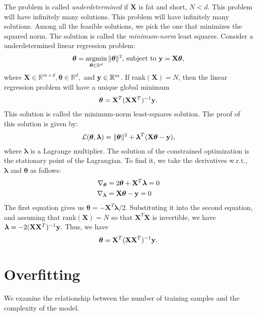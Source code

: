 The problem is called \textit{underdetermined} if $\mathbf{X}$ is fat and short, \ie $N<d$. This problem will have infinitely many solutions.  This problem will have infinitely many solutions. Among all the feasible solutions, we pick the one that minimizes the squared norm. The solution is called the \textit{minimum-norm} least squares. Consider a underdetermined linear regression problem:  
\begin{align*}
	\boldsymbol{\theta} = \operatorname*{\operatorname{argmin}}_{\boldsymbol{\theta}\in \mathbb{R}^d} \|\boldsymbol{\theta}\|^2, \,\textrm{subject to}\ {\mathbf{y}} = \mathbf{X}\boldsymbol{\theta},
\end{align*}
where $\mathbf{X}\in \mathbb{R}^{m\times d}, \boldsymbol{\theta}\in \mathbb{R}^d,$ and ${\mathbf{y}}\in \mathbb{R}^m$. If rank$(\mathbf{X})=N$, then the linear regression problem will have a unique global minimum 
\begin{align*}
	\boldsymbol{\theta} = \mathbf{X}^T(\mathbf{X}\mathbf{X}^T)^{-1}{\mathbf{y}}.
\end{align*}
This solution is called the minimum-norm least-squares solution. The proof of this solution is given by:
\begin{align*}
	\mathcal{L}(\boldsymbol{\theta}, \boldsymbol{\lambda}) = \|\boldsymbol{\theta}\|^2 + \boldsymbol{\lambda}^T(\mathbf{X}\boldsymbol{\theta}-{\mathbf{y}}),
\end{align*}
where $\boldsymbol{\lambda}$ is a Lagrange multiplier. The solution of the constrained optimization is the stationary point of the Lagrangian. To find it, we take the derivatives w.r.t., $\boldsymbol{\lambda}$ and $\boldsymbol{\theta}$ as follows: 
\begin{align*}
	\nabla_{\boldsymbol{\theta}} &= 2 \boldsymbol{\theta} + \mathbf{X}^T\boldsymbol{\lambda} = 0\\ 
	\nabla_{\boldsymbol{\lambda}} &= \mathbf{X}\boldsymbol{\theta} - {\mathbf{y}} = 0
\end{align*}
The first equation gives us $\boldsymbol{\theta} = -\mathbf{X}^T\boldsymbol{\lambda}/2$. Substituting it into the second equation, and assuming that rank$(\mathbf{X})=N$ so that $\mathbf{X}^T\mathbf{X}$ is invertible, we have $\boldsymbol{\lambda} = -2 (\mathbf{X}\mathbf{X}^T)^{-1}{\mathbf{y}}.$ Thus, we have
\begin{align*}
	\boldsymbol{\theta} = \mathbf{X}^T(\mathbf{X}\mathbf{X}^T)^{-1}{\mathbf{y}}.
\end{align*}


\section{Overfitting}
We examine the relationship between the number of training samples and the complexity of the model.


